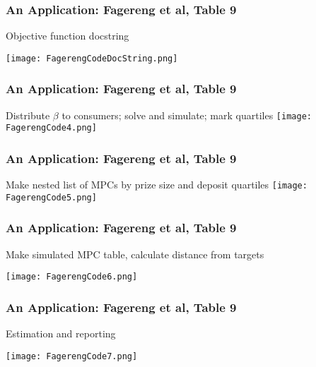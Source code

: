 \documentclass[11ptt]{beamer}
\begin{document}
\begin{frame}
\frametitle{An Application: Fagereng et al, Table 9}

Objective function docstring
\begin{center}
\texttt{[image: FagerengCodeDocString.png]}
\end{center}

\end{frame}



\begin{frame}
\frametitle{An Application: Fagereng et al, Table 9}

Distribute $\beta$ to consumers; solve and simulate; mark quartiles
\texttt{[image: FagerengCode4.png]}

\end{frame}



\begin{frame}
\frametitle{An Application: Fagereng et al, Table 9}

Make nested list of MPCs by prize size and deposit quartiles
\texttt{[image: FagerengCode5.png]}


\end{frame}



\begin{frame}
\frametitle{An Application: Fagereng et al, Table 9}

Make simulated MPC table, calculate distance from targets
\begin{center}
\texttt{[image: FagerengCode6.png]}
\end{center}

\end{frame}



\begin{frame}
\frametitle{An Application: Fagereng et al, Table 9}

Estimation and reporting

\begin{center}
\texttt{[image: FagerengCode7.png]}
\end{center}

\end{frame}




\end{document}
